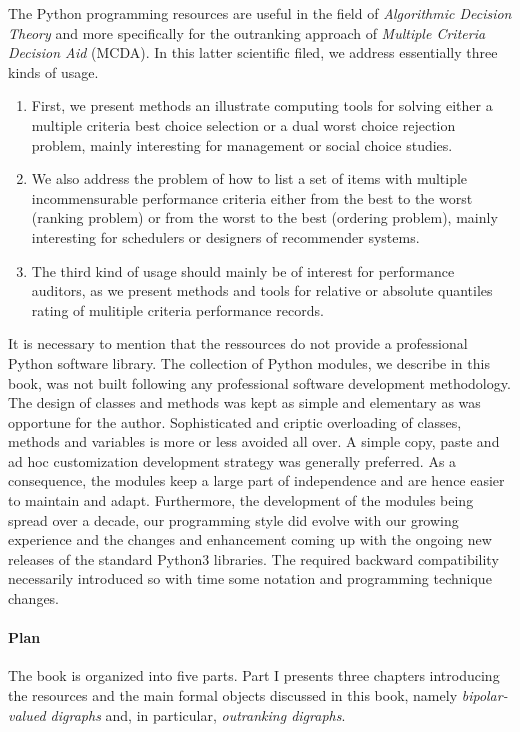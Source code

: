 The \Digraph Python programming resources are useful in the field of \emph{Algorithmic Decision Theory} and more specifically for the outranking approach of \emph{Multiple Criteria Decision Aid} (MCDA). In this latter scientific filed, we address essentially three kinds of usage.
\begin{enumerate}[nosep]
\item First, we present methods an illustrate computing tools for solving either a multiple criteria best choice selection or a dual worst choice rejection problem, mainly interesting for management or social choice studies.
\item We also address the problem of how to list a set of items with multiple incommensurable performance criteria either from the best to the worst (ranking problem) or from the worst to the best (ordering problem), mainly interesting for schedulers or designers of recommender systems.
\item The third kind of usage should mainly be of interest for performance auditors, as we present methods and tools for relative or absolute quantiles rating of mulitiple criteria performance records. 
\end{enumerate}

It is necessary to mention that the \Digraph ressources do not provide a professional Python software library. The collection of Python modules, we describe in this book, was not built following any professional software development methodology. The design of classes and methods was kept as simple and elementary as was opportune for the author. Sophisticated and criptic overloading of classes, methods and variables is more or less avoided all over. A simple copy, paste and ad hoc customization development strategy was generally preferred. As a consequence, the \Digraph modules keep a large part of independence and are hence easier to maintain and adapt.  Furthermore, the development of the \Digraph modules being spread over a decade, our programming style did evolve with our growing experience and the changes and enhancement coming up with the ongoing new releases of the standard Python3 libraries. The required backward compatibility necessarily introduced so with time some notation and programming technique changes.

\paragraph{Plan}

\noindent The book is organized into five parts. Part I presents three chapters introducing the \Digraph resources and the main formal objects discussed in this book, namely \emph{bipolar-valued digraphs} and, in particular, \emph{outranking digraphs}.

